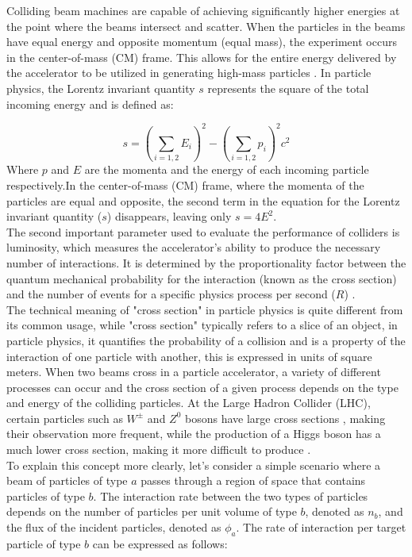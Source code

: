 Colliding beam machines are capable of achieving significantly higher energies at the point where the beams intersect and scatter. When the particles in the beams have equal energy and opposite momentum (equal mass), the experiment occurs in the center-of-mass (CM) frame. This allows for the entire energy delivered by the accelerator to be utilized in generating high-mass particles \cite{undergraduate_accelerators_chapter}. In particle physics, the Lorentz invariant quantity $s$ represents the square of the total incoming energy and is defined as:

\begin{equation}
s = \left ( \sum_{i = 1,2}^{}E_{i} \right )^{2}-\left ( \sum_{i = 1,2}^{}p_{i} \right )^{2}c^{2}
\end{equation}
Where  \textbf{$p$} and $E$ are the momenta and the energy of each incoming particle respectively.In the center-of-mass (CM) frame, where the momenta of the particles are equal and opposite, the second term in the equation for the Lorentz invariant quantity ($s$) disappears, leaving only $s = 4E^2$.\\

The second important parameter used to evaluate the performance of colliders is luminosity, which measures the accelerator's ability to produce the necessary number of interactions. It is determined by the proportionality factor between the quantum mechanical probability for the interaction (known as the cross section) and the number of events for a specific physics process per second ($R$) \cite{ref_lib_vol3}.\\

The technical meaning of "cross section" in particle physics is quite different from its common usage, while "cross section" typically refers to a slice of an object, in particle physics, it quantifies the probability of a collision and is a property of the interaction of one particle with another, this is expressed in units of square meters. When two beams cross in a particle accelerator, a variety of different processes can occur and  the cross section of a given process depends on the type and energy of the colliding particles.
At the Large Hadron Collider (LHC), certain particles such as  $W^{\pm}$ and $Z^{0}$ bosons have large cross sections , making their observation more frequent, while the production of a Higgs boson has a much lower cross section, making it more difficult to produce \cite{thomson_2013}.\\

To explain this concept more clearly, let's consider a simple scenario where a beam of particles of type $a$ passes through a region of space that contains particles of type $b$. The interaction rate between the two types of particles depends on the number of particles per unit volume of type $b$, denoted as $n_{b}$, and the flux of the incident particles, denoted as $\phi_{a}$. The rate of interaction per target particle of type $b$ can be expressed as follows:

